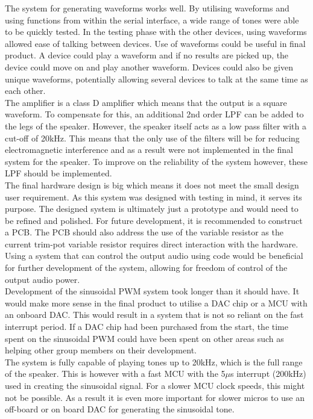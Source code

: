 The system for generating waveforms works well. By utilising waveforms and using functions from within the serial interface, a wide range of tones were able to be quickly tested. In the testing phase with the other devices, using waveforms allowed ease of talking between devices. Use of waveforms could be useful in final product. A device could play a waveform and if no results are picked up, the device could move on and play another waveform. Devices could also be given unique waveforms, potentially allowing several devices to talk at the same time as each other. \\

The amplifier is a class D amplifier which means that the output is a square waveform. To compensate for this, an additional 2nd order LPF can be added to the legs of the speaker. However, the speaker itself acts as a low pass filter with a cut-off of 20kHz. This means that the only use of the filters will be for reducing electromagnetic interference and as a result were not implemented in the final system for the speaker. To improve on the reliability of the system however, these LPF should be implemented. \\

The final hardware design is big which means it does not meet the small design user requirement. As this system was designed with testing in mind, it serves its purpose. The designed system is ultimately just a prototype and would need to be refined and polished. For future development, it is recommended to construct a PCB. The PCB should also address the use of the variable resistor as the current trim-pot variable resistor requires direct interaction with the hardware. Using a system that can control the output audio using code would be beneficial for further development of the system, allowing for freedom of control of the output audio power. \\

Development of the sinusoidal PWM system took longer than it should have. It would make more sense in the final product to utilise a DAC chip or a MCU with an onboard DAC. This would result in a system that is not so reliant on the fast interrupt period. If a DAC chip had been purchased from the start, the time spent on the sinusoidal PWM could have been spent on other areas such as helping other group members on their development. \\

The system is fully capable of playing tones up to 20kHz, which is the full range of the speaker. This is however with a fast MCU with the 5$\mu$s interrupt (200kHz) used in creating the sinusoidal signal. For a slower MCU clock speeds, this might not be possible. As a result it is even more important for slower micros to use an off-board or on board DAC for generating the sinusoidal tone.\\

